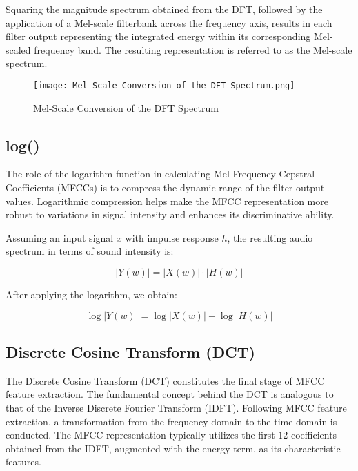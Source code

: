Squaring the magnitude spectrum obtained from the DFT,
followed by the application of a Mel-scale filterbank across
the frequency axis, results in each filter output representing
the integrated energy within its corresponding Mel-scaled
frequency band. The resulting representation is referred to as
the Mel-scale spectrum.

\vspace{-1em}
\begin{figure}[H]
    \centering
    \texttt{[image: Mel-Scale-Conversion-of-the-DFT-Spectrum.png]}
    \caption{Mel-Scale Conversion of the DFT Spectrum \cite{nacem2020subspace}}
    \label{fig:mel-scale-conversion-of-the-dft-spectrum}
\end{figure}
\vspace{-1em}

\subsection{log()}

The role of the logarithm function in calculating
Mel-Frequency Cepstral Coefficients (MFCCs) is to compress
the dynamic range of the filter output values. Logarithmic
compression helps make the MFCC representation more robust to
variations in signal intensity and enhances its discriminative
ability.

Assuming an input signal $x$ with impulse response $h$, the
resulting audio spectrum in terms of sound intensity is:

\begin{equation}
    |Y(w)| = |X(w)| \cdot |H(w)|
\end{equation}

After applying the logarithm, we obtain:

\begin{equation}
    \log|Y(w)| = \log|X(w)| + \log|H(w)|
\end{equation}

\subsection{Discrete Cosine Transform (DCT)}

The Discrete Cosine Transform (DCT) constitutes the final
stage of MFCC feature extraction. The fundamental concept
behind the DCT is analogous to that of the Inverse Discrete
Fourier Transform (IDFT). Following MFCC feature extraction,
a transformation from the frequency domain to the time domain
is conducted. The MFCC representation typically utilizes the
first $12$ coefficients obtained from the IDFT, augmented with
the energy term, as its characteristic features.

